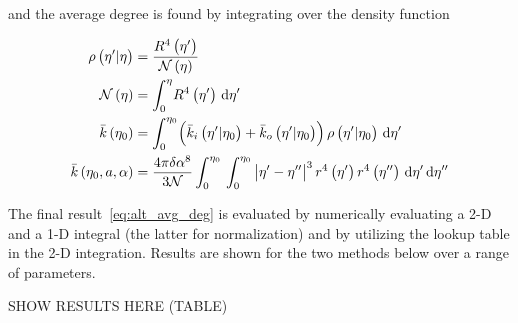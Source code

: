 \documentclass[preprint,notitlepage,amsmath,amssymb,floatfix]{revtex4-1}
\begin{document}
\noindent and the average degree is found by integrating over the density function

\begin{align}
\rho\left(\eta^\prime|\eta\right) &= \frac{R^4\left(\eta^\prime\right)}{\mathcal{N}\left(\eta\right)} \\
\mathcal{N}\left(\eta\right) &= \int_0^\eta\!R^4\left(\eta^\prime\right)\,\mathrm d\eta^\prime \\
\bar{k}\left(\eta_0\right) &= \int_0^{\eta_0}\!\left(\bar{k}_i\left(\eta^\prime|\eta_0\right) + \bar{k}_o\left(\eta^\prime|\eta_0\right)\right)\rho\left(\eta^\prime|\eta_0\right)\,\mathrm d\eta^\prime \\
\bar{k}\left(\eta_0,a,\alpha\right) &= \frac{4\pi\delta\alpha^8}{3\mathcal{N}}\int_0^{\eta_0}\,\int_0^{\eta_0}\,\abs{\eta^\prime - \eta^{\prime\prime}}^3 r^4\left(\eta^\prime\right)r^4\left(\eta^{\prime\prime}\right)\,\mathrm d\eta^\prime\,\mathrm d\eta^{\prime\prime} \label{eq:alt_avg_deg}
\end{align}

\noindent The final result~\eqref{eq:alt_avg_deg} is evaluated by numerically evaluating a 2-D and a 1-D integral (the latter for normalization) and by utilizing the lookup table in the 2-D integration.  Results are shown for the two methods below over a range of parameters.


SHOW RESULTS HERE (TABLE)
\end{document}
